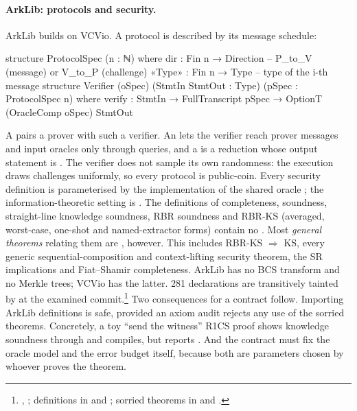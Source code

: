 \paragraph{ArkLib: protocols and security.} ArkLib \cite{arklib2026} builds on VCVio. A protocol is
described by its message schedule:

\begin{leancode}
structure ProtocolSpec (n : ℕ) where
  dir : Fin n → Direction          -- P_to_V (message) or V_to_P (challenge)
  «Type» : Fin n → Type            -- type of the i-th message
structure Verifier (oSpec) (StmtIn StmtOut : Type) (pSpec : ProtocolSpec n) where
  verify : StmtIn → FullTranscript pSpec → OptionT (OracleComp oSpec) StmtOut
\end{leancode}

\noindent A  pairs a prover with such a verifier. An  lets
the verifier reach prover messages and input oracles only through queries, and a  is a
reduction whose output statement is . The verifier does not sample its own randomness:
the execution draws challenges uniformly, so every protocol is public-coin. Every security
definition is parameterised by the implementation of the shared oracle ; the
information-theoretic setting is . The definitions of completeness, soundness,
straight-line knowledge soundness, RBR soundness and RBR-KS (averaged, worst-case, one-shot and
named-extractor forms) contain no . Most \emph{general theorems} relating them are
, however. This includes RBR-KS $\Rightarrow$ KS, every generic sequential-composition
and context-lifting security theorem, the SR implications and Fiat--Shamir completeness. ArkLib has
no BCS transform and no Merkle trees; VCVio has the latter. 281 declarations are transitively
tainted by  at the examined commit.\footnote{,
; definitions in
 and ; sorried theorems in
 and
.} Two consequences for a
contract follow. Importing ArkLib definitions is safe, provided an axiom audit rejects any use of
the sorried theorems. Concretely, a toy ``send the witness'' R1CS proof shows knowledge soundness
through  and compiles, but
 reports . And the contract must fix the oracle model and the
error budget itself, because both are parameters chosen by whoever proves the theorem.

